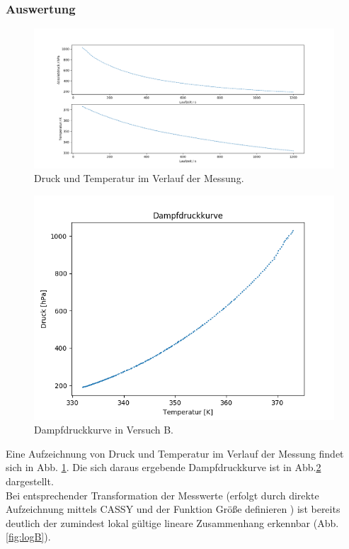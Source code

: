 \documentclass[12pt,a4paper]{article}
\begin{document}
\subsubsection{Auswertung}

\begin{figure}
\begin{center}
\includegraphics[scale=0.4]{Bilder/Rohdaten_HauptmessungB}
\caption[Rohdaten B]{Druck und Temperatur im Verlauf der Messung.}
\label{fig:RohdatenB}
\end{center}
\end{figure}


\begin{figure}
\begin{center}
\includegraphics[scale=0.8]{Bilder/DampfdruckkurveB}
\caption[Dampfdruckkurve B]{Dampfdruckkurve in Versuch B.}
\label{fig:DampfB}
\end{center}
\end{figure}

Eine Aufzeichnung von Druck und Temperatur im Verlauf der Messung findet sich in Abb. \ref{fig:RohdatenB}. Die sich daraus ergebende Dampfdruckkurve ist in Abb.\ref{fig:DampfB} dargestellt.\\
Bei entsprechender Transformation der Messwerte (erfolgt durch direkte Aufzeichnung mittels CASSY und der Funktion \glqq Größe definieren \grqq) ist bereits deutlich der zumindest lokal gültige lineare Zusammenhang erkennbar (Abb.\ref{fig:logB}).
\end{document}
